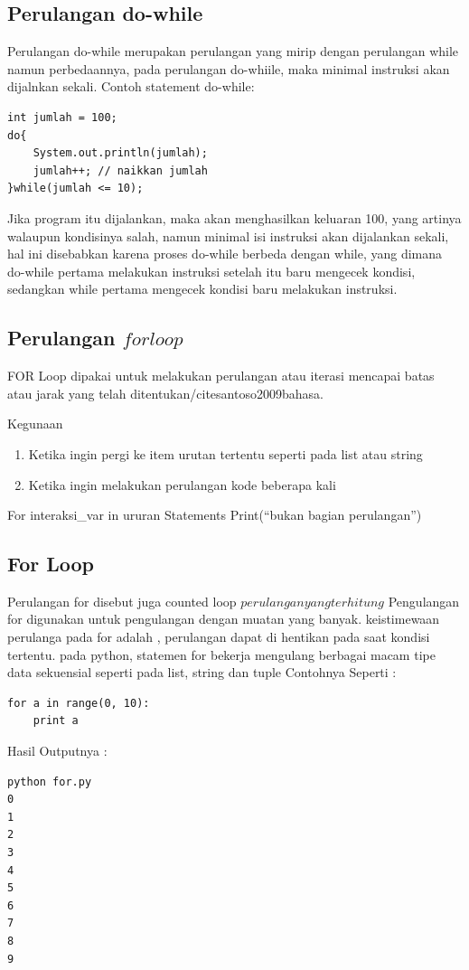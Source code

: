 \subsection{Perulangan do-while}
Perulangan do-while merupakan perulangan yang  mirip dengan perulangan while namun perbedaannya\cite{arfian2012rekayasa}, pada perulangan do-whiile, maka minimal instruksi akan dijalnkan sekali. Contoh statement do-while:
\begin{verbatim}
int jumlah = 100;
do{
    System.out.println(jumlah);
    jumlah++; // naikkan jumlah
}while(jumlah <= 10);
\end{verbatim}
Jika program itu dijalankan, maka akan menghasilkan keluaran 100,  yang artinya walaupun kondisinya salah, namun minimal isi instruksi akan dijalankan sekali, hal ini disebabkan karena proses do-while berbeda dengan while,  yang dimana do-while pertama melakukan instruksi setelah itu baru mengecek kondisi, sedangkan while pertama mengecek kondisi baru melakukan instruksi. 

\subsection{Perulangan \(for loop\)}
FOR Loop dipakai untuk melakukan perulangan atau iterasi mencapai batas atau jarak yang telah ditentukan/cite{santoso2009bahasa}.

Kegunaan
\begin{enumerate}
\item Ketika ingin pergi ke item urutan tertentu seperti pada list atau string
\item Ketika ingin melakukan perulangan kode beberapa kali
\end{enumerate}
For interaksi\_var in ururan
Statements
Print(“bukan bagian perulangan”) 

\subsection{For Loop}
Perulangan for disebut juga counted loop \(perulangan yang terhitung\)
Pengulangan for digunakan untuk pengulangan dengan muatan yang banyak\cite{van2007python}.
keistimewaan perulanga pada for adalah , perulangan dapat di hentikan pada saat kondisi tertentu. pada python, statemen for bekerja mengulang berbagai macam tipe data sekuensial seperti pada list, string dan tuple
Contohnya Seperti :
\begin{verbatim}
for a in range(0, 10):
	print a
\end{verbatim}
Hasil Outputnya :
\begin{verbatim}
python for.py
0
1
2
3
4
5
6
7
8
9
\end{verbatim}


